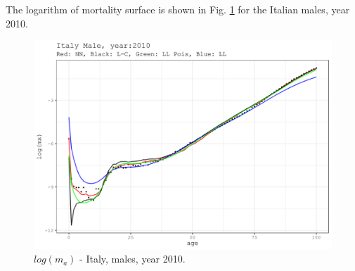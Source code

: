 \documentclass[a4,11pt]{article}
\begin{document}
The logarithm of mortality surface is shown in Fig. \ref{fig:4} for the Italian males, year 2010.
\begin{figure}[H]
		\centering
\includegraphics[width=0.75\linewidth]{m.png}
	 \caption{$log(m_a)$ - Italy, males, year 2010.}
	\label{fig:4}
\end{figure}
\end{document}
